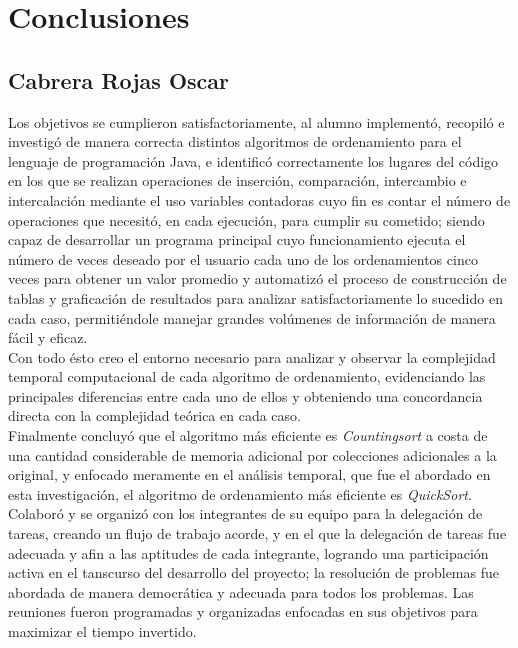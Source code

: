 \documentclass[a4paper,12pt]{article}
\begin{document}
\section{Conclusiones}

\subsection{Cabrera Rojas Oscar}

Los objetivos se cumplieron satisfactoriamente, al alumno implementó, recopiló e investigó de manera correcta distintos algoritmos de ordenamiento para el lenguaje de programación Java, e identificó correctamente los lugares del código en los que se realizan operaciones de inserción, comparación, intercambio e intercalación mediante el uso variables contadoras cuyo fin es contar el número de operaciones que necesitó, en cada ejecución, para cumplir su cometido; siendo capaz de desarrollar un programa principal cuyo funcionamiento ejecuta el número de veces deseado por el usuario cada uno de los ordenamientos cinco veces para obtener un valor promedio y automatizó el proceso de construcción de tablas y graficación de resultados para analizar satisfactoriamente lo sucedido en cada caso, permitiéndole manejar grandes volúmenes de información de manera fácil y eficaz.\\

Con todo ésto creo el entorno necesario para analizar y observar la complejidad temporal computacional de cada algoritmo de ordenamiento, evidenciando las principales diferencias entre cada uno de ellos y obteniendo una concordancia directa con la complejidad teórica en cada caso.\\

Finalmente concluyó que el algoritmo más eficiente es \textit{Countingsort} a costa de una cantidad considerable de memoria adicional por colecciones adicionales a la original, y enfocado meramente en el análisis temporal, que fue el abordado en esta investigación, el algoritmo de ordenamiento más eficiente es \textit{QuickSort}.\\

Colaboró y se organizó con los integrantes de su equipo para la delegación de tareas, creando un flujo de trabajo acorde, y en el que la delegación de tareas fue adecuada y afin a las aptitudes de cada integrante, logrando una participación activa en el tanscurso del desarrollo del proyecto; la resolución de problemas fue abordada de manera democrática y adecuada para todos los problemas. Las reuniones fueron programadas y organizadas enfocadas en sus objetivos para maximizar el tiempo invertido.\\
\end{document}
